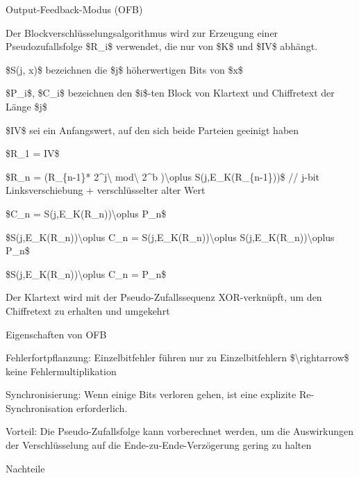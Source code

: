 \documentclass[a4paper]{article}
\begin{document}
\begin{multicols}{3}
      Output-Feedback-Modus (OFB)

      \begin{itemize*}
            \item Der Blockverschlüsselungsalgorithmus wird zur Erzeugung einer
            Pseudozufallsfolge \$R\_i\$ verwendet, die nur von \$K\$ und \$IV\$
            abhängt.
            \begin{itemize*}
                  \item \$S(j, x)\$ bezeichnen die \$j\$ höherwertigen Bits von \$x\$
                  \item \$P\_i\$, \$C\_i\$ bezeichnen den \$i\$-ten Block von Klartext und Chiffretext der Länge \$j\$
                  \item \$IV\$ sei ein Anfangswert, auf den sich beide Parteien geeinigt haben
                  \item \$R\_1 = IV\$
                  \item \$R\_n = (R\_\{n-1\}* 2\^{}j\textbackslash{} mod\textbackslash{} 2\^{}b )\textbackslash oplus S(j,E\_K(R\_\{n-1\}))\$ // j-bit Linksverschiebung + verschlüsselter alter Wert
                  \item \$C\_n = S(j,E\_K(R\_n))\textbackslash oplus P\_n\$
                  \item \$S(j,E\_K(R\_n))\textbackslash oplus C\_n = S(j,E\_K(R\_n))\textbackslash oplus S(j,E\_K(R\_n))\textbackslash oplus P\_n\$
                  \item \$S(j,E\_K(R\_n))\textbackslash oplus C\_n = P\_n\$
            \end{itemize*}
            \item Der Klartext wird mit der Pseudo-Zufallssequenz XOR-verknüpft, um den
            Chiffretext zu erhalten und umgekehrt
            \item Eigenschaften von OFB
            \begin{itemize*}
                  \item Fehlerfortpflanzung: Einzelbitfehler führen nur zu Einzelbitfehlern \$\textbackslash rightarrow\$ keine Fehlermultiplikation
                  \item Synchronisierung: Wenn einige Bits verloren gehen, ist eine explizite Re-Synchronisation erforderlich.
                  \item Vorteil: Die Pseudo-Zufallsfolge kann vorberechnet werden, um die Auswirkungen der Verschlüsselung auf die Ende-zu-Ende-Verzögerung gering zu halten
                  \item Nachteile

\end{itemize*}
\end{itemize*}
\end{multicols}
\end{document}
